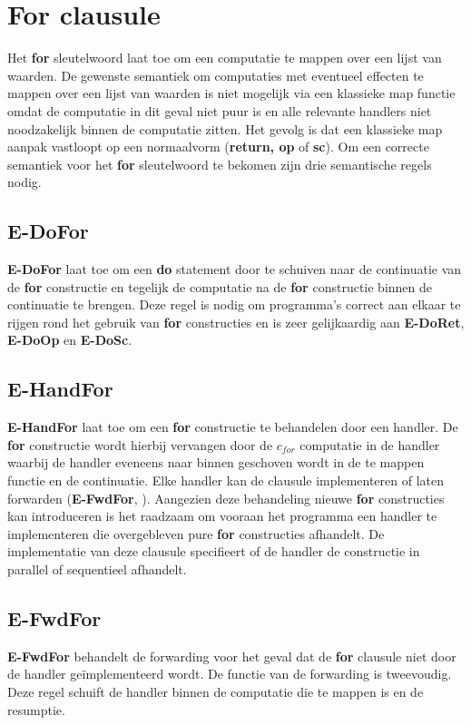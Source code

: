 \section{For clausule}
Het \textbf{for} sleutelwoord laat toe om een computatie te mappen over een lijst van waarden. De gewenste semantiek om computaties met eventueel effecten te mappen over een lijst van waarden is niet mogelijk via een klassieke map functie omdat de computatie in dit geval niet puur is en alle relevante handlers niet noodzakelijk binnen de computatie zitten. Het gevolg is dat een klassieke map aanpak vastloopt op een normaalvorm (\textbf{return, op} of \textbf{sc}). Om een correcte semantiek voor het \textbf{for} sleutelwoord te bekomen zijn drie semantische regels nodig.

\subsection{E-DoFor}
\textbf{E-DoFor} laat toe om een \textbf{do} statement door te schuiven naar de continuatie van de \textbf{for} constructie en tegelijk de computatie na de \textbf{for} constructie binnen de continuatie te brengen. Deze regel is nodig om programma's correct aan elkaar te rijgen rond het gebruik van \textbf{for} constructies en is zeer gelijkaardig aan \textbf{E-DoRet}, \textbf{E-DoOp} en \textbf{E-DoSc}.

\subsection{E-HandFor}
\textbf{E-HandFor} laat toe om een \textbf{for} constructie te behandelen door een handler. De \textbf{for} constructie wordt hierbij vervangen door de $c_{for}$ computatie in de handler waarbij de handler eveneens naar binnen geschoven wordt in de te mappen functie en de continuatie. Elke handler kan de clausule implementeren of laten forwarden (\textbf{E-FwdFor}, ). Aangezien deze behandeling nieuwe \textbf{for} constructies kan introduceren is het raadzaam om vooraan het programma een handler te implementeren die overgebleven pure \textbf{for} constructies afhandelt. De implementatie van deze clausule specifieert of de handler de constructie in parallel of sequentieel afhandelt.

\subsection{E-FwdFor} \label{sec:fwdfor}
\textbf{E-FwdFor} behandelt de forwarding voor het geval dat de \textbf{for} clausule niet door de handler geïmplementeerd wordt. De functie van de forwarding is tweevoudig. Deze regel schuift de handler binnen de computatie die te mappen is en de resumptie.


